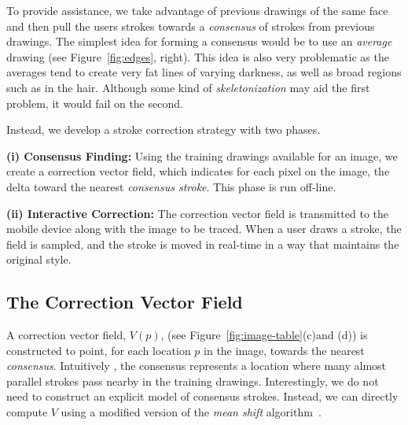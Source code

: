 To provide assistance, we take advantage of previous drawings of the same face and then pull the users strokes towards a {\em consensus} of strokes from previous drawings. The simplest idea for forming a consensus would be to use an {\em average} drawing (see Figure~\ref{fig:edges}, right). This idea is also very problematic as the averages tend to create very fat lines of varying darkness, as well as broad regions such as in the hair. Although some kind of {\em skeletonization} may aid the first problem, it would fail on the second.

Instead, we develop a stroke correction strategy with two phases.

\textbf{(i) Consensus Finding:} Using the training drawings available for an image, we create a correction vector field, which indicates for each pixel on the image, the delta toward the nearest {\em consensus stroke}.  This phase is run off-line.

\textbf{(ii) Interactive Correction:} The correction vector field is transmitted to the mobile device along with the image to be traced.  When a user draws a stroke, the field is sampled, and the stroke is moved in real-time in a way that maintains the original style.

\subsection{The Correction Vector Field}


A correction vector field, $V(p)$, (see Figure~\ref{fig:image-table}(c)and (d)) is constructed to point, for each location $p$ in the image, towards the nearest {\em consensus}. Intuitively , the consensus represents a location where many almost parallel strokes pass nearby in the training drawings. Interestingly, we do not need to construct an explicit model of consensus strokes. Instead, we can directly compute $V$ using a modified version of the {\em mean shift} algorithm~\cite{10.1109/ICCV.1999.790416}.


